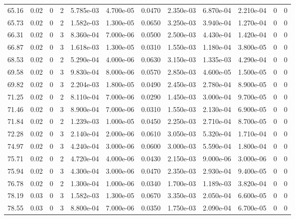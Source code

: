 \documentclass[preview]{standalone}
\begin{document}
{{{{\begin{tabular}{L{1.2cm}C{1.2cm} C{0.3cm}C{0.5cm} C{1.4cm}C{1.4cm} C{1.4cm}C{1.4cm} C{1.6cm}C{1.6cm} C{1.6cm}C{1.6cm}}
  65.16  &  0.02  & 0     &  2 &  5.785e-03  & 4.700e-05  &  0.0470&   2.350e-03& 6.870e-04 & 2.210e-04   &  0 & 0  \\ 
  65.73  &  0.02  & 0     &  2 &  1.582e-03  & 1.300e-05  &  0.0650&   3.250e-03& 3.940e-04 & 1.270e-04   &  0 & 0  \\ 
  66.31  &  0.02  & 0     &  3 &  8.360e-04  & 7.000e-06  &  0.0500&   2.500e-03& 4.430e-04 & 1.420e-04   &  0 & 0  \\ 
  66.87  &  0.02  & 0     &  3 &  1.618e-03  & 1.300e-05  &  0.0310&   1.550e-03& 1.180e-04 & 3.800e-05   &  0 & 0  \\ 
  68.53  &  0.02  & 0     &  2 &  5.290e-04  & 4.000e-06  &  0.0630&   3.150e-03& 1.335e-03 & 4.290e-04   &  0 & 0  \\ 
  69.58  &  0.02  & 0     &  3 &  9.830e-04  & 8.000e-06  &  0.0570&   2.850e-03& 4.600e-05 & 1.500e-05   &  0 & 0  \\ 
  69.82  &  0.02  & 0     &  3 &  2.204e-03  & 1.800e-05  &  0.0490&   2.450e-03& 2.780e-04 & 8.900e-05   &  0 & 0  \\ 
  71.25  &  0.02  & 0     &  2 &  8.110e-04  & 7.000e-06  &  0.0290&   1.450e-03& 3.000e-04 & 9.700e-05   &  0 & 0  \\ 
  71.46  &  0.02  & 0     &  3 &  8.900e-04  & 7.000e-06  &  0.0310&   1.550e-03& 2.130e-04 & 6.900e-05   &  0 & 0  \\ 
  71.84  &  0.02  & 0     &  2 &  1.239e-03  & 1.000e-05  &  0.0450&   2.250e-03& 2.710e-04 & 8.700e-05   &  0 & 0  \\ 
  72.28  &  0.02  & 0     &  3 &  2.140e-04  & 2.000e-06  &  0.0610&   3.050e-03& 5.320e-04 & 1.710e-04   &  0 & 0  \\ 
  74.97  &  0.02  & 0     &  3 &  4.240e-04  & 3.000e-06  &  0.0600&   3.000e-03& 5.590e-04 & 1.800e-04   &  0 & 0  \\ 
  75.71  &  0.02  & 0     &  2 &  4.720e-04  & 4.000e-06  &  0.0430&   2.150e-03& 9.000e-06 & 3.000e-06   &  0 & 0  \\ 
  75.94  &  0.02  & 0     &  3 &  4.300e-04  & 3.000e-06  &  0.0470&   2.350e-03& 2.930e-04 & 9.400e-05   &  0 & 0  \\ 
  76.78  &  0.02  & 0     &  2 &  1.300e-04  & 1.000e-06  &  0.0340&   1.700e-03& 1.189e-03 & 3.820e-04   &  0 & 0  \\ 
  78.19  &  0.03  & 0     &  3 &  1.582e-03  & 1.300e-05  &  0.0670&   3.350e-03& 2.050e-04 & 6.600e-05   &  0 & 0  \\ 
  78.55  &  0.03  & 0     &  3 &  8.800e-04  & 7.000e-06  &  0.0350&   1.750e-03& 2.090e-04 & 6.700e-05   &  0 & 0  \\ 

\end{tabular}}}}}
\end{document}
